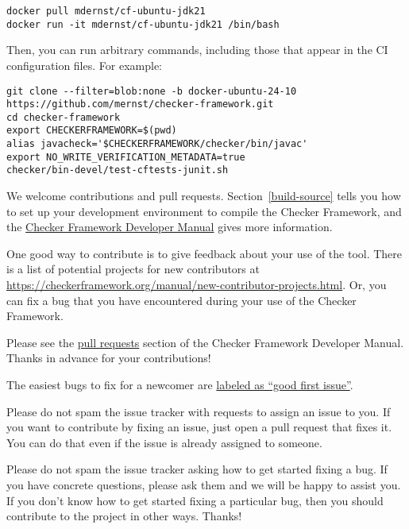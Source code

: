 \begin{Verbatim}
docker pull mdernst/cf-ubuntu-jdk21
docker run -it mdernst/cf-ubuntu-jdk21 /bin/bash
\end{Verbatim}

Then, you can run arbitrary commands, including those that appear in the
CI configuration files.  For example:

\begin{Verbatim}
git clone --filter=blob:none -b docker-ubuntu-24-10 https://github.com/mernst/checker-framework.git
cd checker-framework
export CHECKERFRAMEWORK=$(pwd)
alias javacheck='$CHECKERFRAMEWORK/checker/bin/javac'
export NO_WRITE_VERIFICATION_METADATA=true
checker/bin-devel/test-cftests-junit.sh
\end{Verbatim}



We welcome contributions and pull requests.  Section~\ref{build-source}
tells you how to set up your development environment to compile the Checker
Framework, and the
\href{https://checkerframework.org/manual/developer-manual.html}{Checker
  Framework Developer Manual} gives more information.

One good way to contribute is to give feedback about your use of the tool.
There is a list
of potential projects for new contributors at
\url{https://checkerframework.org/manual/new-contributor-projects.html}.
Or, you can fix a bug that
you have encountered during your use of the Checker Framework.



Please see the
\href{https://checkerframework.org/manual/developer-manual.html#pull-requests}{pull
  requests} section of the Checker Framework Developer Manual.
Thanks in advance for your contributions!

The easiest bugs to fix for a newcomer are
\href{https://github.com/typetools/checker-framework/issues?q=is\%3Aopen+is\%3Aissue+label\%3A\%22good+first+issue\%22}{labeled
  as ``good first issue''}.

Please do not spam the issue tracker with requests to assign an issue to
you.  If you want to contribute by fixing an issue, just open a pull
request that fixes it.  You can do that even if the issue is already
assigned to someone.

Please do not spam the issue tracker asking how to get started fixing a
bug.  If you have concrete questions, please ask them and we will be happy
to assist you.  If you don't know how to get started fixing a particular
bug, then you should contribute to the project in other ways.  Thanks!


